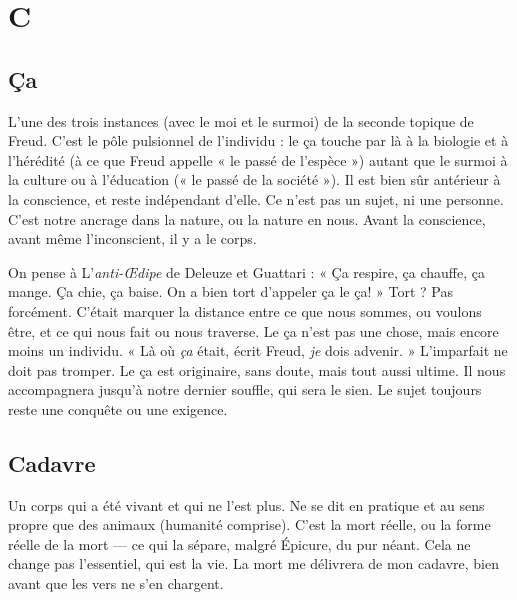 
\chapter{C}

\section{Ça}
L’une des trois instances (avec le moi et le surmoi) de la seconde topique
de Freud. C’est le pôle pulsionnel de l'individu : le ça touche par là à la
biologie et à l’hérédité (à ce que Freud appelle « le passé de l’espèce ») autant
que le surmoi à la culture ou à l'éducation (« le passé de la société »). Il est bien
sûr antérieur à la conscience, et reste indépendant d’elle. Ce n’est pas un sujet,
ni une personne. C’est notre ancrage dans la nature, ou la nature en nous.
Avant la conscience, avant même l’inconscient, il y a le corps.

On pense à L'{\it anti-Œdipe} de Deleuze et Guattari : « Ça respire, ça chauffe,
ça mange. Ça chie, ça baise. On a bien tort d’appeler ça le ça! » Tort ? Pas
forcément. C’était marquer la distance entre ce que nous sommes, ou voulons
être, et ce qui nous fait ou nous traverse. Le ça n’est pas une chose, mais encore
moins un individu. « Là où {\it ça} était, écrit Freud, {\it je} dois advenir. » L’imparfait
ne doit pas tromper. Le ça est originaire, sans doute, mais tout aussi ultime. Il
nous accompagnera jusqu’à notre dernier souffle, qui sera le sien. Le sujet toujours
reste une conquête ou une exigence.

\section{Cadavre}
Un corps qui a été vivant et qui ne l’est plus. Ne se dit en pratique
et au sens propre que des animaux (humanité comprise).
C’est la mort réelle, ou la forme réelle de la mort — ce qui la sépare, malgré Épicure,
du pur néant. Cela ne change pas l'essentiel, qui est la vie. La mort me
délivrera de mon cadavre, bien avant que les vers ne s’en chargent.

